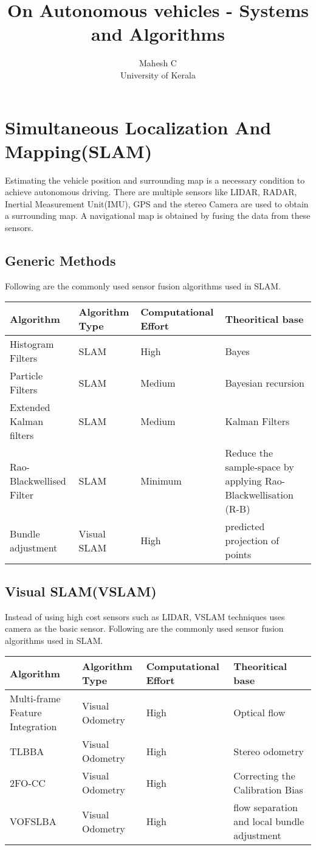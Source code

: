 \documentclass{article}
\title{On Autonomous vehicles - Systems and Algorithms}
\author{Mahesh C\\University of Kerala}
\begin{document}
\maketitle
\section{Simultaneous Localization And Mapping(SLAM) }
Estimating the vehicle position and surrounding map  is a necessary condition to achieve autonomous driving. There are multiple sensors like LIDAR, RADAR, Inertial Measurement Unit(IMU), GPS and the stereo Camera are  used to obtain a surrounding map. A navigational map  is obtained by fusing the data from these  sensors.\\

\subsection{Generic Methods}
Following are the commonly used sensor fusion algorithms used in SLAM.\\

\begin{tabular}{|p{3cm}|p{2cm}|p{3cm}|p{4cm}|}
\hline
Algorithm	&Algorithm Type	&Computational Effort	&Theoritical base\\
\hline
Histogram Filters	&SLAM	&High	&Bayes\\
\hline
Particle Filters	&SLAM 	&Medium	&Bayesian recursion\\
\hline
Extended Kalman filters	&SLAM	&Medium	&Kalman Filters\\
\hline
Rao-Blackwellised Filter	&SLAM	&Minimum	&Reduce the sample-space by applying Rao-Blackwellisation (R-B)\\
\hline
Bundle adjustment	&Visual SLAM	&High	&predicted projection of points\\
\hline
\end{tabular}

\subsection{Visual SLAM(VSLAM)}
Instead of using high cost sensors such as LIDAR, VSLAM techniques uses camera as the basic sensor.
Following are the commonly used sensor fusion algorithms used in SLAM.\\
\begin{tabular}{|p{3cm}|p{2cm}|p{3cm}|p{4cm}|}
\hline
Algorithm	&Algorithm Type	&Computational Effort	&Theoritical base\\
\hline
Multi-frame Feature Integration	&Visual Odometry	&High	&Optical flow\\
\hline
TLBBA	&Visual Odometry	&High	&Stereo odometry\\
\hline
2FO-CC	&Visual Odometry	&High	&Correcting the Calibration Bias\\
\hline
VOFSLBA	&Visual Odometry	&High	&flow separation and local bundle adjustment\\
\hline
\end{tabular}
\end{document}
